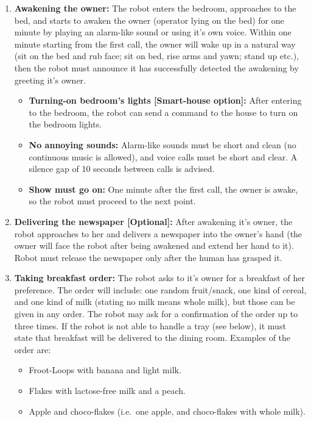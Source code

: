 \begin{enumerate}

	\item \textbf{Awakening the owner:} The robot enters the bedroom, approaches to the bed, and starts to awaken the owner (operator lying on the bed) for one minute by playing an alarm-like sound or using it's own voice. Within one minute starting from the first call, the owner will wake up in a natural way (sit on the bed and rub face; sit on bed, rise arms and yawn; stand up etc.), then the robot must announce it has successfully detected the awakening by greeting it's owner.
	\begin{itemize}
		\item \textbf{Turning-on bedroom's lights [Smart-house option]:} After entering to the bedroom, the robot can send a command to the house to turn on the bedroom lights.
		\item \textbf{No annoying sounds:} Alarm-like sounds must be short and clean (no continuous music is allowed), and voice calls must be short and clear. A silence gap of 10 seconds between calls is advised.
		\item \textbf{Show must go on:} One minute after the first call, the owner is awake, so the robot must proceed to the next point.
	\end{itemize}

	\item \textbf{Delivering the newspaper [Optional]:} After awakening it's owner, the robot approaches to her and delivers a newspaper into the owner's hand (the owner will face the robot after being awakened and extend her hand to it). Robot must release the newspaper only after the human has grasped it.

	\item \textbf{Taking breakfast order:} The robot asks to it's owner for a breakfast of her preference. The order will include: one random fruit/snack, one kind of cereal, and one kind of milk (stating no milk means whole milk), but those can be given in any order. The robot may ask for a confirmation of the order up to three times. If the robot is not able to handle a tray (see below), it must state that breakfast will be delivered to the dining room. Examples of the order are:

	\begin{itemize}
	\item Froot-Loops with banana and light milk.
	\item Flakes with lactose-free milk and a peach.
	\item Apple and choco-flakes (i.e.~one apple, and choco-flakes with whole milk).
	\end{itemize}


\end{enumerate}
